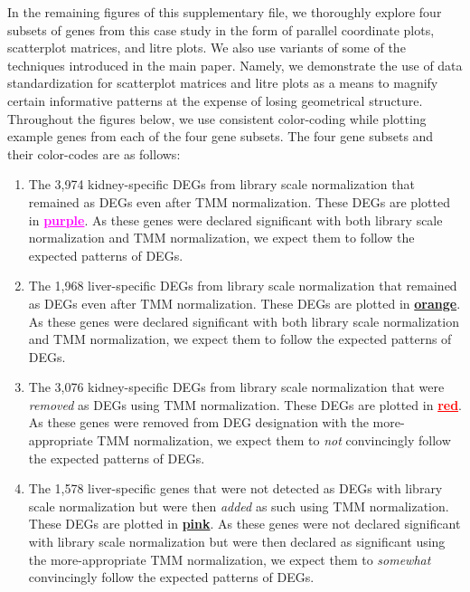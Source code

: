 \documentclass{article}
\begin{document}
  In the remaining figures of this supplementary file, we thoroughly explore four subsets of genes from this case study in the form of parallel coordinate plots, scatterplot matrices, and litre plots. We also use variants of some of the techniques introduced in the main paper. Namely, we demonstrate the use of data standardization for scatterplot matrices and litre plots as a means to magnify certain informative patterns at the expense of losing geometrical structure. Throughout the figures below, we use consistent color-coding while plotting example genes from each of the four gene subsets. The four gene subsets and their color-codes are as follows:
  
  \begin{enumerate}
  
  \item The 3,974 kidney-specific DEGs from library scale normalization that remained as DEGs even after TMM normalization. These DEGs are plotted in \textbf{\textcolor{Fuchsia}{\underline{purple}}}. As these genes were declared significant with both library scale normalization and TMM normalization, we expect them to follow the expected patterns of DEGs.
  
  \item The 1,968 liver-specific DEGs from library scale normalization that remained as DEGs even after TMM normalization. These DEGs are plotted in \textbf{\textcolor{Bittersweet}{\underline{orange}}}. As these genes were declared significant with both library scale normalization and TMM normalization, we expect them to follow the expected patterns of DEGs.
  
  \item The 3,076 kidney-specific DEGs from library scale normalization that were \textit{removed} as DEGs using TMM normalization. These DEGs are plotted in \textbf{\textcolor{Red}{\underline{red}}}. As these genes were removed from DEG designation with the more-appropriate TMM normalization, we expect them to \textit{not} convincingly follow the expected patterns of DEGs.
  
  \item The 1,578 liver-specific genes that were not detected as DEGs with library scale normalization but were then \textit{added} as such using TMM normalization. These DEGs are plotted in \textbf{\textcolor{RubineRed}{\underline{pink}}}. As these genes were not declared significant with library scale normalization but were then declared as significant using the more-appropriate TMM normalization, we expect them to \textit{somewhat} convincingly follow the expected patterns of DEGs.
  
  \end{enumerate}
  
\end{document}
